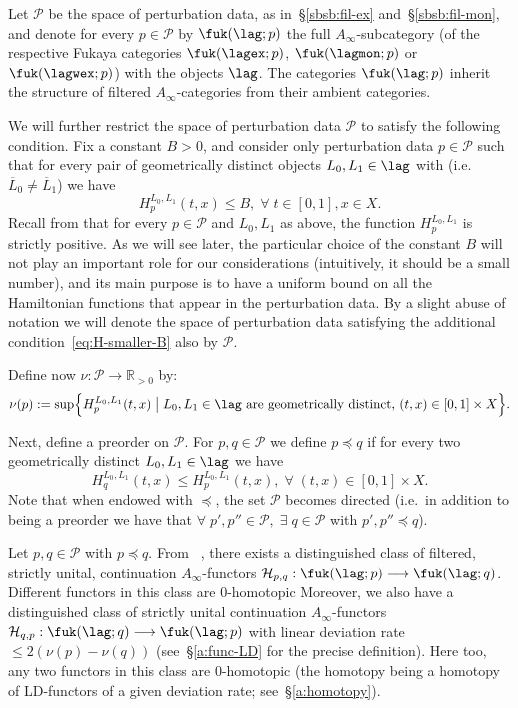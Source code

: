 Let $\mathcal{P}$ be the space of perturbation data, as
in~\S\ref{sbsb:fil-ex} and~\S\ref{sbsb:fil-mon}, and denote for every
$p \in \mathcal{P}$ by $\fuk(\lag;p)$ the full
$A_{\infty}$-subcategory (of the respective Fukaya categories
$\fuk(\lagex;p)$, $\fuk(\lagmon;p)$ or $\fuk(\lagwex;p)$) with the
objects $\lag$. The categories $\fuk(\lag;p)$ inherit the structure of
filtered $A_{\infty}$-categories from their ambient categories.

We will further restrict the space of perturbation data $\mathcal{P}$
to satisfy the following condition. Fix a constant $B > 0$, and
consider only perturbation data $p \in \mathcal{P}$ such that for
every pair of geometrically distinct objects $L_0, L_1 \in \lag$ with
(i.e.~$\overline{L}_0 \neq \overline{L}_1$) we have
\begin{equation} \label{eq:H-smaller-B} H_p^{L_0,L_1}(t,x) \leq B, \;
  \forall \; t \in [0,1], x \in X.
\end{equation}
Recall from \cite{Amb:fil-fuk} that for every $p \in \mathcal{P}$ and $L_0, L_1$ as above, the
function $H_p^{L_0, L_1}$ is strictly positive. As we will see later,
the particular choice of the constant $B$ will not play an important
role for our considerations (intuitively, it should be a small
number), and its main purpose is to have a uniform bound on all the
Hamiltonian functions that appear in the perturbation data. By a
slight abuse of notation we will denote the space of perturbation data
satisfying the additional condition~\eqref{eq:H-smaller-B} also by
$\mathcal{P}$.

Define now $\nu: \mathcal{P} \longrightarrow \mathbb{R}_{>0}$ by:
\begin{equation} \label{eq:nu-fuk}
  \nu(p) := \sup \Bigl\{H_p^{L_0, L_1}(t,x) \bigm| L_0, L_1 \in \lag
  \text{\ are geometrically distinct, }
  (t,x) \in [0,1]\times X\Bigr\}.
\end{equation}

Next, define a preorder on $\mathcal{P}$. For $p, q \in \mathcal{P}$
we define $p \preceq q$ if for every two geometrically distinct
$L_0, L_1 \in \lag$ we have
$$H_q^{L_0, L_1}(t,x) \leq H_p^{L_0, L_1}(t,x), \; \forall \; (t,x) \in
[0,1] \times X.$$ Note that when endowed with $\preceq$, the set
$\mathcal{P}$ becomes directed (i.e.~in addition to being a preorder
we have that
$\forall \; p', p'' \in \mathcal{P}, \; \exists \; q \in \mathcal{P}$
with $p', p'' \preceq q$).

Let $p, q \in \mathcal{P}$ with $p \preceq q$. From ~\cite{Amb:fil-fuk},
there exists a distinguished class of filtered, strictly unital,
continuation $A_{\infty}$-functors
$\mathcal{H}_{p,q}: \fuk(\lag;p) \longrightarrow
\fuk(\lag;q)$. Different functors in this class are $0$-homotopic
Moreover, we also have a distinguished class of strictly unital
continuation $A_{\infty}$-functors
$\mathcal{H}_{q,p}: \fuk(\lag;q) \longrightarrow \fuk(\lag;p)$ with
linear deviation rate $\leq 2(\nu(p) - \nu(q))$ (see~\S\ref{a:func-LD}
for the precise definition). Here too, any two functors in this class
are $0$-homotopic (the homotopy being a homotopy of LD-functors of a
given deviation rate; see~\S\ref{a:homotopy}).

